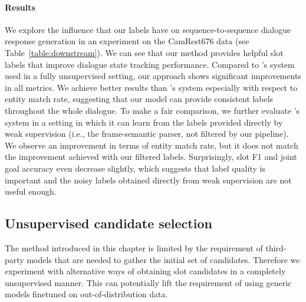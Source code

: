\paragraph{Results} We explore the influence that our labels have on sequence-to-sequence dialogue response generation in an experiment on the CamRest676 data (see Table~\ref{table:downstream}).
We can see that our method provides helpful slot labels that improve dialogue state tracking performance.
Compared to \citet{jin2018explicit}'s system used in a fully unsupervised setting, our approach shows significant improvements in all metrics.
We achieve better results than \citet{jin2018explicit}'s system especially with respect to entity match rate, suggesting that our model can provide consistent labels throughout the whole dialogue.
To make a fair comparison, we further evaluate \citet{jin2018explicit}'s system in a setting in which it can learn from the labels provided directly by weak supervision (i.e., the frame-semantic parser, not filtered by our pipeline).
We observe an improvement in terms of entity match rate, but it does not match the improvement achieved with our filtered labels. Surprisingly, slot F1 and joint goal accuracy even decrease slightly, 
which suggests that label quality is important and the noisy labels obtained directly from weak supervision are not useful enough.

\subsection{Unsupervised candidate selection}
The method introduced in this chapter is limited by the requirement of third-party models that are needed to gather the initial set of candidates.
Therefore we experiment with alternative ways of obtaining slot candidates in a completely unsupervised manner.
This can potentially lift the requirement of using generic models finetuned on out-of-distribution data.

